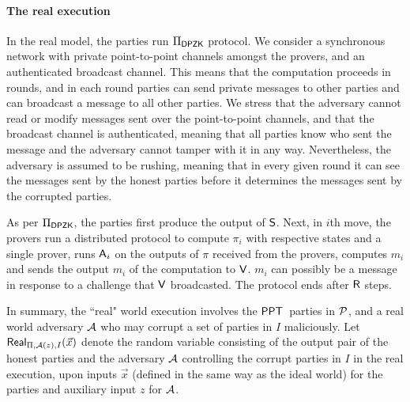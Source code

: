 \paragraph{The real execution} In the real model, the parties run $\Pi_{\mathsf{DPZK}}$ protocol.  We consider a synchronous network with private point-to-point channels amongst the provers, and an authenticated broadcast channel. This means that the computation proceeds in rounds, and in each round parties can send private messages to other parties and can broadcast a message to all other parties. We stress that the adversary cannot read or modify messages sent over the point-to-point channels, and that the broadcast channel is authenticated, meaning that all parties know who sent the message and the adversary cannot tamper with it in any way. Nevertheless, the adversary is assumed to be rushing, meaning that in every given round it can see the messages sent by the honest parties before it determines the messages sent by the corrupted parties. 

As per $\Pi_{\mathsf{DPZK}}$, the parties first produce the output of $\mathsf{S}$. Next, in $i$th move,  the  provers run a distributed protocol to compute $\pi_i$ with respective states and a single prover, runs $\mathsf{A}_i$ on the outputs of $\pi$ received from the provers, computes $m_i$ and sends the output $m_i$ of the computation to $\mathsf{V}$. $m_i$ can possibly be  a message in response to a challenge that $\mathsf{V}$ broadcasted. The protocol ends after $\mathsf{R}$ steps.

In summary,  the ``real" world execution involves the $\mathsf{PPT}$\ parties  in $\mathcal{P}$,  and a real world adversary $\mathcal{A}$ who may corrupt  a set of parties in $I$ maliciously.  Let $\mathsf{Real}_{\Pi, \mathcal{A}(z),I}(\vec{x})$ denote the random variable consisting of the output pair of the honest parties and the adversary $\mathcal{A}$ controlling the corrupt parties in $I$ in the real execution, upon inputs $\vec{x}$ (defined in the same way as the ideal world) for the parties and auxiliary input $z$ for $\mathcal{A}$. 


